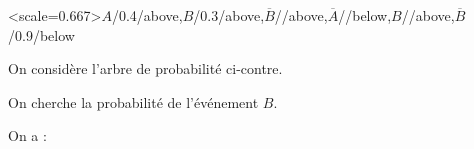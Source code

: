 
\begin{wrapstuff}[r,leftsep=7.5mm,abovesep=-6.5mm]
	\ArbreProbasTikz<scale=0.667>{$A$/\num{0.4}/above,$B$/\num{0.3}/above,$\overline{B}$//above,$\overline{A}$//below,$B$//above,$\overline{B}$/\num{0.9}/below}
\end{wrapstuff}

On considère l'arbre de probabilité ci-contre.

On cherche la probabilité de l'événement $B$.

\smallskip

On a :

\smallskip

